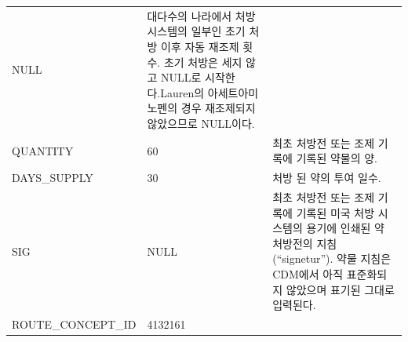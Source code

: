 \documentclass[11pt]{book}
\theoremstyle{definition}
\theoremstyle{definition}
\theoremstyle{definition}
\theoremstyle{remark}
\begin{document}
\begin{longtable}[]{@{}lll@{}}
\begin{minipage}[t]{0.16\columnwidth}
NULL\strut
\end{minipage} & \begin{minipage}[t]{0.48\columnwidth}\raggedright\strut
대다수의 나라에서 처방 시스템의 일부인 초기 처방 이후 자동 재조제 횟수.
초기 처방은 세지 않고 NULL로 시작한다.Lauren의 아세트아미노펜의 경우
재조제되지 않았으므로 NULL이다.\strut
\end{minipage}\tabularnewline
\begin{minipage}[t]{0.28\columnwidth}\raggedright\strut
QUANTITY\strut
\end{minipage} & \begin{minipage}[t]{0.16\columnwidth}\raggedright\strut
60\strut
\end{minipage} & \begin{minipage}[t]{0.48\columnwidth}\raggedright\strut
최초 처방전 또는 조제 기록에 기록된 약물의 양.\strut
\end{minipage}\tabularnewline
\begin{minipage}[t]{0.28\columnwidth}\raggedright\strut
DAYS\_SUPPLY\strut
\end{minipage} & \begin{minipage}[t]{0.16\columnwidth}\raggedright\strut
30\strut
\end{minipage} & \begin{minipage}[t]{0.48\columnwidth}\raggedright\strut
처방 된 약의 투여 일수.\strut
\end{minipage}\tabularnewline
\begin{minipage}[t]{0.28\columnwidth}\raggedright\strut
SIG\strut
\end{minipage} & \begin{minipage}[t]{0.16\columnwidth}\raggedright\strut
NULL\strut
\end{minipage} & \begin{minipage}[t]{0.48\columnwidth}\raggedright\strut
최초 처방전 또는 조제 기록에 기록된 미국 처방 시스템의 용기에 인쇄된 약
처방전의 지침 (``signetur''). 약물 지침은 CDM에서 아직 표준화되지
않았으며 표기된 그대로 입력된다.\strut
\end{minipage}\tabularnewline
\begin{minipage}[t]{0.28\columnwidth}\raggedright\strut
ROUTE\_CONCEPT\_ID\strut
\end{minipage} & \begin{minipage}[t]{0.16\columnwidth}\raggedright\strut
4132161\strut
\end{minipage} & \begin{minipage}[t]{0.48\columnwidth}\raggedright\strut

\end{minipage}
\end{longtable}
\end{document}
